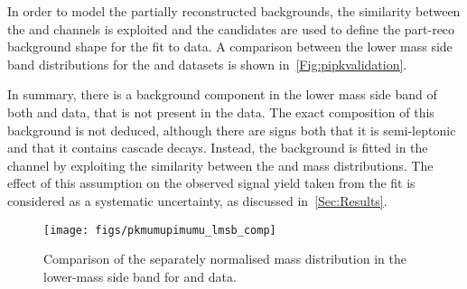 In order to model the partially reconstructed backgrounds, the similarity between the \Lbpi and \LbK channels is exploited and the \LbK candidates are used to define the part-reco background shape for the fit to \Lbpi data. A comparison between the lower mass side band distributions for the \Lbpi and \LbK datasets is shown in~\autoref{Fig:pipkvalidation}.

In summary, there is a background component in the lower mass side band of both \LbK and \Lbpi data, that is not present in the \Lbpijpsi data. The exact composition of this background is not deduced, although there are signs both that it is semi-leptonic and that it contains \Lc cascade decays. Instead, the background is fitted in the \Lbpi channel by exploiting the similarity between the \Lbpi and \LbK mass distributions. The effect of this assumption on the observed signal yield taken from the fit is considered as a systematic uncertainty, as discussed in~\autoref{Sec:Results}.

\begin{figure}[!h]\def\nh{0.3\textwidth}
  
  \centering
  
  \texttt{[image: figs/pkmumupimumu\_lmsb\_comp]}

  \caption{Comparison of the separately normalised \Lb mass distribution in the lower-mass side band for \LbK and \Lbpi data.}
\label{Fig:pipkvalidation}
\end{figure}
\FloatBarrier



\clearpage




 
